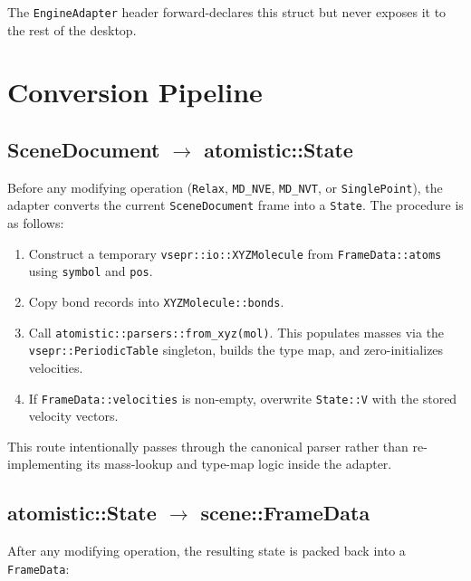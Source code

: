 ﻿\documentclass[11pt]{article}
\newcommand{\type}[1]{\texttt{#1}}
\newcommand{\field}[1]{\texttt{#1}}
\newcommand{\op}[1]{\texttt{#1}}
\begin{document}
The \type{EngineAdapter} header forward-declares this struct but never exposes
it to the rest of the desktop.
\section{Conversion Pipeline}
\label{sec:pipeline}

\subsection{SceneDocument $\rightarrow$ atomistic::State}

Before any modifying operation (\texttt{Relax}, \texttt{MD\_NVE},
\texttt{MD\_NVT}, or \texttt{SinglePoint}), the adapter converts the current
\type{SceneDocument} frame into a \type{State}. The procedure is as follows:

\begin{enumerate}
  \item Construct a temporary \type{vsepr::io::XYZMolecule} from
        \field{FrameData::atoms} using \field{symbol} and \field{pos}.
  \item Copy bond records into \field{XYZMolecule::bonds}.
  \item Call \op{atomistic::parsers::from\_xyz(mol)}. This populates masses via
        the \type{vsepr::PeriodicTable} singleton, builds the type map, and
        zero-initializes velocities.
  \item If \field{FrameData::velocities} is non-empty, overwrite
        \field{State::V} with the stored velocity vectors.
\end{enumerate}

This route intentionally passes through the canonical parser rather than
re-implementing its mass-lookup and type-map logic inside the adapter.

\subsection{atomistic::State $\rightarrow$ scene::FrameData}

After any modifying operation, the resulting state is packed back into a
\type{FrameData}:
\end{document}
